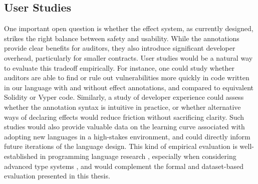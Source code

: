 \subsection{User Studies}
One important open question is whether the effect system, as currently designed, strikes the right balance between safety and usability. While the annotations provide clear benefits for auditors, they also introduce significant developer overhead, particularly for smaller contracts. User studies would be a natural way to evaluate this tradeoff empirically. For instance, one could study whether auditors are able to find or rule out vulnerabilities more quickly in code written in our language with and without effect annotations, and compared to equivalent Solidity or Vyper code. Similarly, a study of developer experience could assess whether the annotation syntax is intuitive in practice, or whether alternative ways of declaring effects would reduce friction without sacrificing clarity. Such studies would also provide valuable data on the learning curve associated with adopting new languages in a high-stakes environment, and could directly inform future iterations of the language design. This kind of empirical evaluation is well-established in programming language research \cite{Stefik2013} \cite{Crichton2021}, especially when considering advanced type systems \cite{Ferdowsi2023}, and would complement the formal and dataset-based evaluation presented in this thesis.


